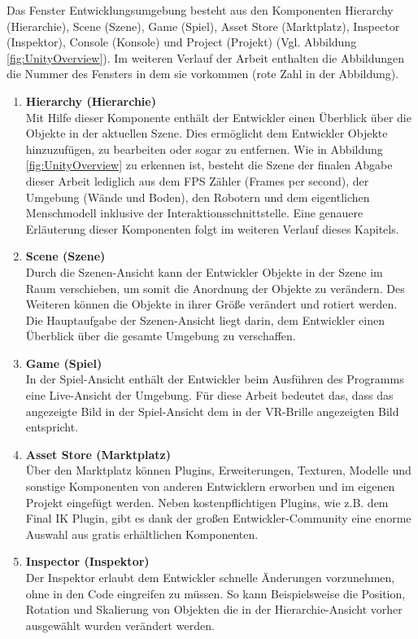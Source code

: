\newpage
\noindent Das Fenster Entwicklungsumgebung besteht aus den Komponenten Hierarchy (Hierarchie), Scene (Szene), Game (Spiel), Asset Store (Marktplatz), Inspector (Inspektor), Console (Konsole) und Project (Projekt) (Vgl. Abbildung \ref{fig:UnityOverview}). Im weiteren Verlauf der Arbeit enthalten die Abbildungen die Nummer des Fensters in dem sie vorkommen (rote Zahl in der Abbildung).
\begin{enumerate}
	\item \textbf{Hierarchy (Hierarchie)} \\
	Mit Hilfe dieser Komponente enthält der Entwickler einen Überblick über die Objekte in der aktuellen Szene. Dies ermöglicht dem Entwickler Objekte hinzuzufügen, zu bearbeiten oder sogar zu entfernen. Wie in Abbildung \ref{fig:UnityOverview} zu erkennen ist, besteht die Szene der finalen Abgabe dieser Arbeit lediglich aus dem FPS Zähler (Frames per second), der Umgebung (Wände und Boden), den Robotern und dem eigentlichen Menschmodell inklusive der Interaktionsschnittstelle. Eine genauere Erläuterung dieser Komponenten folgt im weiteren Verlauf dieses Kapitels.
	\item \textbf{Scene (Szene)} \\
	Durch die Szenen-Ansicht kann der Entwickler Objekte in der Szene im Raum verschieben, um somit die Anordnung der Objekte zu verändern. Des Weiteren können die Objekte in ihrer Größe verändert und rotiert werden. Die Hauptaufgabe der Szenen-Ansicht liegt darin, dem Entwickler einen Überblick über die gesamte Umgebung zu verschaffen.
	\item \textbf{Game (Spiel)} \\
	In der Spiel-Ansicht enthält der Entwickler beim Ausführen des Programms eine Live-Ansicht der Umgebung. Für diese Arbeit bedeutet das, dass das angezeigte Bild in der Spiel-Ansicht dem in der VR-Brille angezeigten Bild entspricht.
	\item \textbf{Asset Store (Marktplatz)} \\
	Über den Marktplatz können Plugins, Erweiterungen, Texturen, Modelle und sonstige Komponenten von anderen Entwicklern erworben und im eigenen Projekt eingefügt werden. Neben kostenpflichtigen Plugins, wie z.B. dem Final IK Plugin, gibt es dank der großen Entwickler-Community eine enorme Auswahl aus gratis erhältlichen Komponenten.
	\item \textbf{Inspector (Inspektor)} \\
	Der Inspektor erlaubt dem Entwickler schnelle Änderungen vorzunehmen, ohne in den Code eingreifen zu müssen. So kann Beispielsweise die Position, Rotation und Skalierung von Objekten die in der Hierarchie-Ansicht vorher ausgewählt wurden verändert werden.

\end{enumerate}
